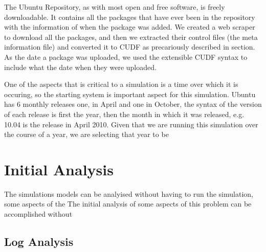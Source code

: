 The Ubuntu Repository, as with most open and free software, is freely downloadable.
It contains all the packages that have ever been in the repository with the information of when the package was added.
We created a web scraper to download all the packages, and then we extracted their control files (the meta information file) and converted it to CUDF as precariously described in section. %
As the date a package was uploaded, we used the extensible CUDF syntax to include what the date when they were uploaded.

One of the aspects that is critical to a simulation is a time over which it is occuring, 
so the starting system is important aspect for this simulation.
Ubuntu has 6 monthly releases one, in April and one in October, the syntax of the version of each release is first the year,
then the month in which it was released, e.g. 10.04 is the release in April 2010.
Given that we are running this simulation over the course of a year, we are selecting that year to be 


\section{Initial Analysis}
{}The simulations models can be analyised without having to run the simulation, some aspects of the 
{}The initial analysis of some aspects of this problem can be accomplished without 


\subsection{Log Analysis}





